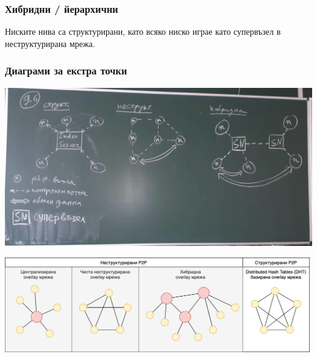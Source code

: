 \documentclass[fleqn,12pt]{article}
\begin{document}
\subsubsection{Хибридни / йерархични}
Ниските нива са структурирани, като всяко ниско играе като супервъзел в неструктурирана мрежа.

\subsubsection{Диаграми за екстра точки}

\begin{center}\includegraphics[width=180mm]{p2p.png}\end{center}

\begin{center} \includegraphics[width=500px]{p2p_overlay_topologies.png} \end{center}
\end{document}
